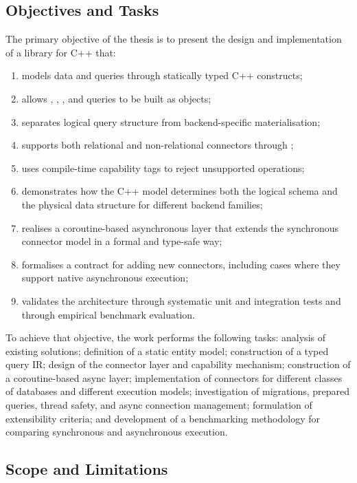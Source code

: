 \subsection{Objectives and Tasks}

The primary objective of the thesis is to present the design and implementation of a \ORMName{} library for C++ that:

\begin{enumerate}[label=\arabic*.]
    \item models data and queries through statically typed C++ constructs;
    \item allows , , , and  queries to be built as  objects;
    \item separates logical query structure from backend-specific materialisation;
    \item supports both relational and non-relational connectors through ;
    \item uses compile-time capability tags to reject unsupported operations;
    \item demonstrates how the C++ model determines both the logical schema and the physical data structure for different backend families;
    \item realises a coroutine-based asynchronous layer that extends the synchronous connector model in a formal and type-safe way;
    \item formalises a contract for adding new connectors, including cases where they support native asynchronous execution;
    \item validates the architecture through systematic unit and integration tests and through empirical benchmark evaluation.
\end{enumerate}

To achieve that objective, the work performs the following tasks: analysis of existing solutions; definition of a static entity model; construction of a typed query IR; design of the connector layer and capability mechanism; construction of a coroutine-based async layer; implementation of connectors for different classes of databases and different execution models; investigation of migrations, prepared queries, thread safety, and async connection management; formulation of extensibility criteria; and development of a benchmarking methodology for comparing synchronous and asynchronous execution.

\subsection{Scope and Limitations}

